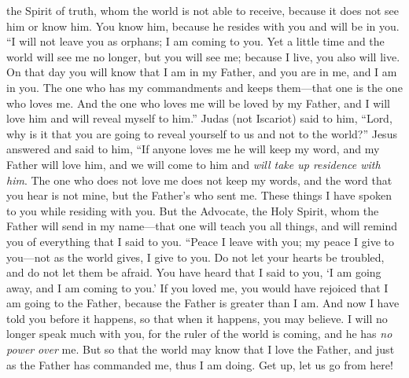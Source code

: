 \begin{biblechapter}
\verse the Spirit of truth, whom the world is not able to receive, because it does not see him or know him. You know him, because he resides with you and will be in you.
\verse “I will not leave you as orphans; I am coming to you.
\verse Yet a little time and the world will see me no longer, but you will see me; because I live, you also will live.
\verse On that day you will know that I am in my Father, and you are in me, and I am in you.
\verse The one who has my commandments and keeps them—that one is the one who loves me. And the one who loves me will be loved by my Father, and I will love him and will reveal myself to him.”
\verse Judas (not Iscariot) said to him, “Lord, why is it that you are going to reveal yourself to us and not to the world?”
\verse Jesus answered and said to him, “If anyone loves me he will keep my word, and my Father will love him, and we will come to him and \textit{will take up residence with him}.
\verse The one who does not love me does not keep my words, and the word that you hear is not mine, but the Father’s who sent me.
\verse These things I have spoken to you while residing with you.
\verse But the Advocate, the Holy Spirit, whom the Father will send in my name—that one will teach you all things, and will remind you of everything that I said to you.
\verse “Peace I leave with you; my peace I give to you—not as the world gives, I give to you. Do not let your hearts be troubled, and do not let them be afraid.
\verse You have heard that I said to you, ‘I am going away, and I am coming to you.’ If you loved me, you would have rejoiced that I am going to the Father, because the Father is greater than I am.
\verse And now I have told you before it happens, so that when it happens, you may believe.
\verse I will no longer speak much with you, for the ruler of the world is coming, and he has \textit{no power} \textit{over} me.
\verse But so that the world may know that I love the Father, and just as the Father has commanded me, thus I am doing. Get up, let us go from here!
\end{biblechapter}

